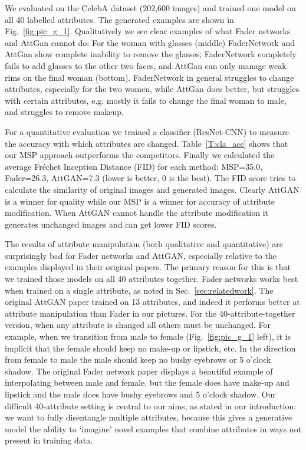 \documentclass{article}
\begin{document}
We evaluated on the CelebA dataset \cite{liu2015deep} (202,600 images) and trained one model on all 40 labelled attributes. 
The generated examples are shown in Fig.~\ref{fig:pic_g_1}.
Qualitatively  we see clear examples of what Fader networks and AttGan cannot do: For the woman with glasses (middle) FaderNetwork and AttGan show complete inability to remove the glasses; FaderNetwork completely fails to add glasses to the other two faces, and AttGan can only manage weak rims on the final woman (bottom). FaderNetwork in general struggles to change attributes, especially for the two women, while AttGan does better, but struggles with certain attributes, e.g. mostly it fails to change the final woman to male, and struggles to remove makeup.





For a quantitative evaluation we trained a classifier (ResNet-CNN) to measure the accuracy with which attributes are changed.
Table~\ref{T:cla_acc} shows that our MSP approach outperforms the competitors.
Finally we calculated the average Fr\'echet Inception Distance
(FID) \cite{frechet}
for each method: MSP=35.0, Fader=26.3, AttGAN=7.3 (lower is better, 0 is the best).
The FID score tries to calculate the similarity of original images and generated images. 
Clearly AttGAN is a winner for quality while our MSP is a winner for accuracy of attribute modification.
When AttGAN  cannot handle the attribute modification it  generates  unchanged images and can get  lower FID scores.

The results of attribute manipulation (both qualitative and quantitative) are surprisingly bad for Fader networks and AttGAN, especially relative to the examples displayed in their original papers. The primary reason for this is that we trained those models on all 40 attributes together. Fader networks works best when trained on a single attribute, as noted in Sec.~\ref{sec:relatedwork}.  The original AttGAN paper trained on 13 attributes, and indeed it performs better at attribute manipulation than Fader in our pictures. For the 40-attribute-together version, when any attribute is changed all others must be unchanged. For example, when we transition from male to female (Fig.~\ref{fig:pic_g_1} left), it is implicit that the female should keep no make-up or lipstick, etc. In the direction from female to male the male should keep no bushy eyebrows or 5 o'clock shadow. The original Fader network paper displays a beautiful example of interpolating between male and female, but the female does have make-up and lipstick and the male does have bushy eyebrows and 5 o'clock shadow.
Our difficult 40-attribute setting is central to our aims, as stated in our introduction:
we want to fully disentangle multiple attributes, because this gives a
generative model the ability to `imagine' novel examples that combine attributes in ways not present in training data.
\end{document}
